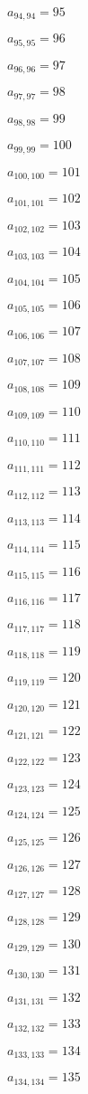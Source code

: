 \documentclass[a4paper,12pt]{article}
\begin{document}
$a _{ 94, 94 } = 95$

$a _{ 95, 95 } = 96$

$a _{ 96, 96 } = 97$

$a _{ 97, 97 } = 98$

$a _{ 98, 98 } = 99$

$a _{ 99, 99 } = 100$

$a _{ 100, 100 } = 101$

$a _{ 101, 101 } = 102$

$a _{ 102, 102 } = 103$

$a _{ 103, 103 } = 104$

$a _{ 104, 104 } = 105$

$a _{ 105, 105 } = 106$

$a _{ 106, 106 } = 107$

$a _{ 107, 107 } = 108$

$a _{ 108, 108 } = 109$

$a _{ 109, 109 } = 110$

$a _{ 110, 110 } = 111$

$a _{ 111, 111 } = 112$

$a _{ 112, 112 } = 113$

$a _{ 113, 113 } = 114$

$a _{ 114, 114 } = 115$

$a _{ 115, 115 } = 116$

$a _{ 116, 116 } = 117$

$a _{ 117, 117 } = 118$

$a _{ 118, 118 } = 119$

$a _{ 119, 119 } = 120$

$a _{ 120, 120 } = 121$

$a _{ 121, 121 } = 122$

$a _{ 122, 122 } = 123$

$a _{ 123, 123 } = 124$

$a _{ 124, 124 } = 125$

$a _{ 125, 125 } = 126$

$a _{ 126, 126 } = 127$

$a _{ 127, 127 } = 128$

$a _{ 128, 128 } = 129$

$a _{ 129, 129 } = 130$

$a _{ 130, 130 } = 131$

$a _{ 131, 131 } = 132$

$a _{ 132, 132 } = 133$

$a _{ 133, 133 } = 134$

$a _{ 134, 134 } = 135$
\end{document}
